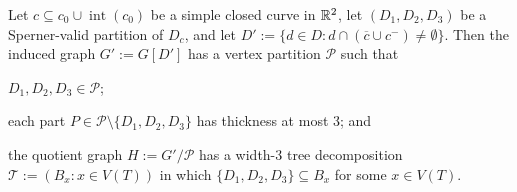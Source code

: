 \documentclass{patmorin}
\DeclareMathOperator{\interior}{int}
\begin{document}
\begin{lem}
    Let $c\subseteq c_0\cup\interior(c_0)$ be a simple closed curve in $\mathbb{R}^2$, let $(D_1,D_2,D_3)$ be a Sperner-valid partition of $D_c$, and let $D':=\{d\in D:d\cap (\overline{c}\cup c^-)\neq\emptyset\}$.  Then the induced graph $G':=G[D']$ has a vertex partition $\mathcal{P}$ such that 
    \begin{compactenum}[(i)]
      \item $D_1,D_2,D_3 \in \mathcal{P}$;
      \item each part $P\in\mathcal{P}\setminus\{D_1,D_2,D_3\}$ has thickness at most 3; and
      \item the quotient graph $H:=G'/\mathcal{P}$ has a width-$3$ tree decomposition $\mathcal{T}:=(B_x:x\in V(T))$ in which $\{D_1,D_2,D_3\}\subseteq B_x$ for some $x\in V(T)$.
    \end{compactenum}
\end{lem}
\end{document}
